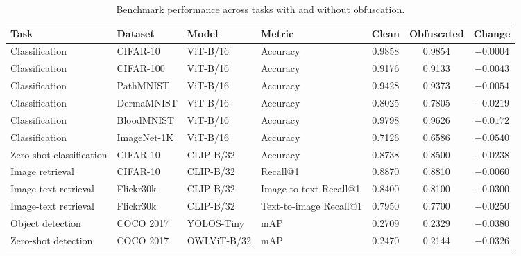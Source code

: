 \documentclass{ieeeaccess}
\newcommand{\rev}[1]{{\color{black}#1}}
\begin{document}
\begin{table}[t]
\centering
\caption{\rev{Benchmark performance across tasks with and without obfuscation.}}
\label{tab:performance}
\scriptsize
\setlength{\tabcolsep}{3pt}
\begin{tabular}{p{} p{} p{} p{} c c c}
\toprule
\rev{\textbf{Task}} & \rev{\textbf{Dataset}} & \rev{\textbf{Model}} & \rev{\textbf{Metric}} & \rev{\textbf{Clean}} & \rev{\textbf{Obfuscated}} & \rev{\textbf{Change}} \\
\midrule
\rev{Classification} & \rev{CIFAR-10} & \rev{ViT-B/16} & \rev{Accuracy} & \rev{0.9858} & \rev{0.9854} & \rev{$-0.0004$} \\
\rev{Classification} & \rev{CIFAR-100} & \rev{ViT-B/16} & \rev{Accuracy} & \rev{0.9176} & \rev{0.9133} & \rev{$-0.0043$} \\
\rev{Classification} & \rev{PathMNIST} & \rev{ViT-B/16} & \rev{Accuracy} & \rev{0.9428} & \rev{0.9373} & \rev{$-0.0054$} \\
\rev{Classification} & \rev{DermaMNIST} & \rev{ViT-B/16} & \rev{Accuracy} & \rev{0.8025} & \rev{0.7805} & \rev{$-0.0219$} \\
\rev{Classification} & \rev{BloodMNIST} & \rev{ViT-B/16} & \rev{Accuracy} & \rev{0.9798} & \rev{0.9626} & \rev{$-0.0172$} \\
\rev{Classification} & \rev{ImageNet-1K} & \rev{ViT-B/16} & \rev{Accuracy} & \rev{0.7126} & \rev{0.6586} & \rev{$-0.0540$} \\
\midrule
\rev{Zero-shot classification} & \rev{CIFAR-10} & \rev{CLIP-B/32} & \rev{Accuracy} & \rev{0.8738} & \rev{0.8500} & \rev{$-0.0238$} \\
\rev{Image retrieval} & \rev{CIFAR-10} & \rev{CLIP-B/32} & \rev{Recall@1} & \rev{0.8870} & \rev{0.8810} & \rev{$-0.0060$} \\
\rev{Image-text retrieval} & \rev{Flickr30k} & \rev{CLIP-B/32} & \rev{Image-to-text Recall@1} & \rev{0.8400} & \rev{0.8100} & \rev{$-0.0300$} \\
\rev{Image-text retrieval} & \rev{Flickr30k} & \rev{CLIP-B/32} & \rev{Text-to-image Recall@1} & \rev{0.7950} & \rev{0.7700} & \rev{$-0.0250$} \\
\midrule
\rev{Object detection} & \rev{COCO 2017} & \rev{YOLOS-Tiny} & \rev{mAP} & \rev{0.2709} & \rev{0.2329} & \rev{$-0.0380$} \\
\rev{Zero-shot detection} & \rev{COCO 2017} & \rev{OWLViT-B/32} & \rev{mAP} & \rev{0.2470} & \rev{0.2144} & \rev{$-0.0326$} \\

\end{tabular}
\end{table}
\end{document}

